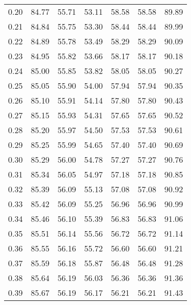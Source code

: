 \begin{tabular}{|c|c|c|c|c|c|c|}
      0.20 &     84.77 &     55.71 &      53.11 &   58.58 &      58.58 &         89.89 \\
      0.21 &     84.84 &     55.75 &      53.30 &   58.44 &      58.44 &         89.99 \\
      0.22 &     84.89 &     55.78 &      53.49 &   58.29 &      58.29 &         90.09 \\
      0.23 &     84.95 &     55.82 &      53.66 &   58.17 &      58.17 &         90.18 \\
      0.24 &     85.00 &     55.85 &      53.82 &   58.05 &      58.05 &         90.27 \\
      0.25 &     85.05 &     55.90 &      54.00 &   57.94 &      57.94 &         90.35 \\
      0.26 &     85.10 &     55.91 &      54.14 &   57.80 &      57.80 &         90.43 \\
      0.27 &     85.15 &     55.93 &      54.31 &   57.65 &      57.65 &         90.52 \\
      0.28 &     85.20 &     55.97 &      54.50 &   57.53 &      57.53 &         90.61 \\
      0.29 &     85.25 &     55.99 &      54.65 &   57.40 &      57.40 &         90.69 \\
      0.30 &     85.29 &     56.00 &      54.78 &   57.27 &      57.27 &         90.76 \\
      0.31 &     85.34 &     56.05 &      54.97 &   57.18 &      57.18 &         90.85 \\
      0.32 &     85.39 &     56.09 &      55.13 &   57.08 &      57.08 &         90.92 \\
      0.33 &     85.42 &     56.09 &      55.25 &   56.96 &      56.96 &         90.99 \\
      0.34 &     85.46 &     56.10 &      55.39 &   56.83 &      56.83 &         91.06 \\
      0.35 &     85.51 &     56.14 &      55.56 &   56.72 &      56.72 &         91.14 \\
      0.36 &     85.55 &     56.16 &      55.72 &   56.60 &      56.60 &         91.21 \\
      0.37 &     85.59 &     56.18 &      55.87 &   56.48 &      56.48 &         91.28 \\
      0.38 &     85.64 &     56.19 &      56.03 &   56.36 &      56.36 &         91.36 \\
      0.39 &     85.67 &     56.19 &      56.17 &   56.21 &      56.21 &         91.43 \\

\end{tabular}
